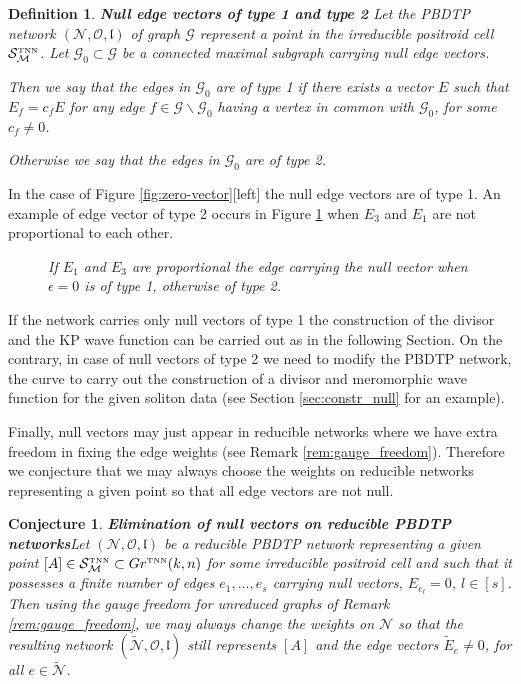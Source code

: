 \documentclass[11pt]{amsart}
\theoremstyle{plain}
\numberwithin{equation}{section}
\newtheorem{definition}{Definition}[subsection]
\newtheorem{conjecture}{Conjecture}[subsection]
\def \GTNN {{Gr^{\mbox{\tiny TNN}} (k,n)}}
\def \S {{\mathcal S}_{\mathcal M}^{\mbox{\tiny TNN}}}
\begin{document}
\begin{definition}\label{def:null_type_1_2}\textbf{Null edge vectors of type 1 and type 2}
Let the PBDTP network $({\mathcal N},{\mathcal O},\mathfrak l)$ of graph $\mathcal G$ represent a point in the irreducible positroid cell $\S$. Let $\mathcal G_0\subset \mathcal G$ be a connected maximal subgraph carrying null edge vectors.

Then we say that the edges in $\mathcal G_0$ are of type 1 if there exists a vector $E$ such that $E_f=c_fE$ for any edge $f\in \mathcal G\backslash \mathcal G_0$ having a vertex in common with $\mathcal G_0$, for some $c_f\ne 0$.

Otherwise we say that the edges in $\mathcal G_0$ are of type 2.
\end{definition}

In the case of Figure \ref{fig:zero-vector}[left] the null edge vectors are of type 1. An example of edge vector of type 2 
occurs in Figure \ref{fig:div_null_2} when $E_3$ and $E_1$ are not proportional to each other. 
\begin{figure}%
	\vspace{-2. truecm}
  \caption{\small{\sl If $E_1$ and $E_3$ are proportional the edge carrying the null vector when $\epsilon=0$ is of type 1, otherwise of type 2.}\label{fig:div_null_2}}
\end{figure}
If the network carries only null vectors of type 1 the construction of the divisor and the KP wave function can be carried out as in the following Section. On the contrary, in case of null vectors of type 2 we need to modify the PBDTP network, the curve to carry out the construction of a divisor and meromorphic wave function for the given soliton data (see Section \ref{sec:constr_null} for an example).  


Finally, null vectors may just appear in reducible networks where we have extra freedom in fixing the edge weights (see Remark \ref{rem:gauge_freedom}). Therefore we conjecture that we may always choose the weights on reducible networks representing a given point so that all edge vectors are not null.

\begin{conjecture}\textbf{Elimination of null vectors on reducible PBDTP networks}\label{conj:null}
Let $({\mathcal N}, \mathcal O, \mathfrak l)$ be a reducible PBDTP network representing a given point $[A]\in\S \subset \GTNN$ for some irreducible positroid cell and such that it possesses a finite number of edges $e_1,\dots, e_s$ carrying null vectors,
$E_{e_l} = 0$, $l\in [s]$. Then using the gauge freedom for unreduced graphs of Remark \ref{rem:gauge_freedom}, we may always change the weights on $\mathcal N$ so that the resulting network $({\tilde {\mathcal N}}, \mathcal O, \mathfrak l)$ still represents $[A]$ and the edge vectors ${\tilde E}_e \not =0$, for all $e\in {\tilde {\mathcal N}}$.
\end{conjecture}
\end{document}
